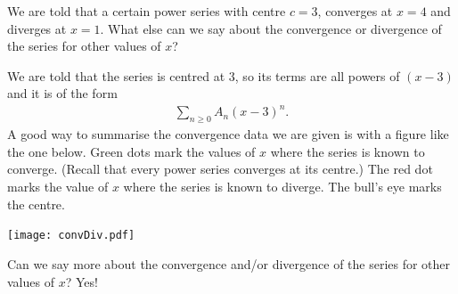 \begin{eg}\label{eg:SRintervalA}
We are told that a certain power series with centre $c=3$, converges
at $x=4$ and diverges at $x=1$. What else can we say about the
convergence or divergence of the series for other values of $x$?


We are told that the series is centred at $3$, so its terms are all powers of $(x-3)$ and it is of the form
\begin{align*}
\sum_{n \geq 0} A_n (x-3)^n.
\end{align*}
A good way to summarise the convergence data we are given is with
a figure like the one below. Green dots mark the values of $x$ where
the series is known to converge. (Recall that every power series
converges at its centre.)  The red dot marks the value of $x$ where
the series is known to diverge. The bull's eye marks the centre.
\begin{efig}
\begin{center}
     \texttt{[image: convDiv.pdf]}
\end{center}
\end{efig}
Can we say more about the convergence and/or divergence of the series for other values of $x$? Yes!


\end{eg}
